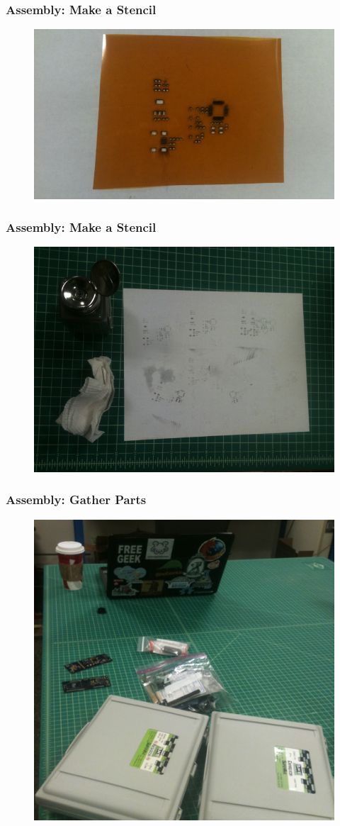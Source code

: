 \documentclass{beamer}
\begin{document}

\begin{frame}
\frametitle{Assembly: Make a Stencil}
\begin{figure}
\includegraphics[width=0.9\linewidth]{assemble3.png}
\end{figure}
\end{frame}


\begin{frame}
\frametitle{Assembly: Make a Stencil}
\begin{figure}
\includegraphics[width=0.8\linewidth]{assemble4.png}
\end{figure}
\end{frame}


\begin{frame}
\frametitle{Assembly: Gather Parts}
\begin{figure}
\includegraphics[width=0.5\linewidth]{assemble5.png}
\end{figure}
\end{frame}
\end{document}
